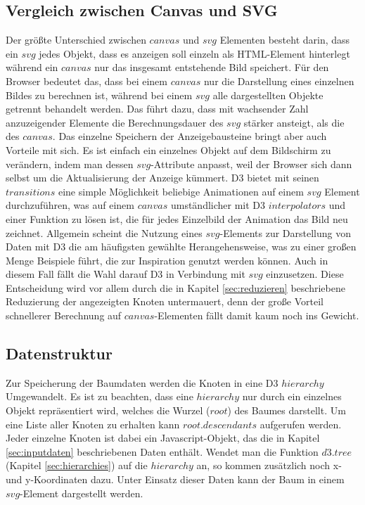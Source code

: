 \subsection{Vergleich zwischen Canvas und SVG}\label{sec:cvs}
Der größte Unterschied zwischen $canvas$ und $svg$ Elementen besteht darin, dass ein $svg$ jedes Objekt, dass es anzeigen soll einzeln als HTML-Element hinterlegt während ein $canvas$ nur das insgesamt entstehende Bild speichert. Für den Browser bedeutet das, dass bei einem $canvas$ nur die Darstellung eines  einzelnen Bildes zu berechnen ist, während bei einem $svg$ alle dargestellten Objekte getrennt behandelt werden. Das führt dazu, dass mit wachsender Zahl anzuzeigender Elemente die Berechnungsdauer des $svg$ stärker ansteigt, als die des $canvas$. Das einzelne Speichern der Anzeigebausteine bringt aber auch Vorteile mit sich. Es ist einfach ein einzelnes Objekt auf dem Bildschirm zu verändern, indem man dessen $svg$-Attribute anpasst, weil der Browser sich dann selbst um die Aktualisierung der Anzeige kümmert. D3 bietet mit seinen $transitions$ eine simple Möglichkeit beliebige Animationen auf einem $svg$ Element durchzuführen, was auf einem $canvas$ umständlicher mit D3 $interpolators$ und einer Funktion zu lösen ist, die für jedes Einzelbild der Animation das Bild neu zeichnet. Allgemein scheint die Nutzung eines $svg$-Elements zur Darstellung von Daten mit D3 die am häufigsten gewählte Herangehensweise, was zu einer großen Menge Beispiele führt, die zur Inspiration genutzt werden können. Auch in diesem Fall fällt die Wahl darauf D3 in Verbindung mit $svg$ einzusetzen. Diese Entscheidung wird vor allem durch die in Kapitel \ref{sec:reduzieren} beschriebene Reduzierung der angezeigten Knoten untermauert, denn der große Vorteil schnellerer Berechnung auf $canvas$-Elementen fällt damit kaum noch ins Gewicht.

\subsection{Datenstruktur}
Zur Speicherung der Baumdaten werden die Knoten in eine D3 $hierarchy$ Umgewandelt. Es ist zu beachten, dass eine $hierarchy$ nur durch ein einzelnes Objekt repräsentiert wird, welches die Wurzel ($root$) des Baumes darstellt. Um eine Liste aller Knoten zu erhalten kann $root.descendants$ aufgerufen werden. Jeder einzelne Knoten ist dabei ein Javascript-Objekt, das die in Kapitel \ref{sec:inputdaten} beschriebenen Daten enthält. Wendet man die Funktion $d3.tree$ (Kapitel \ref{sec:hierarchies}) auf die $hierarchy$ an, so kommen zusätzlich noch x- und y-Koordinaten dazu. Unter Einsatz dieser Daten kann der Baum in einem $svg$-Element dargestellt werden.

